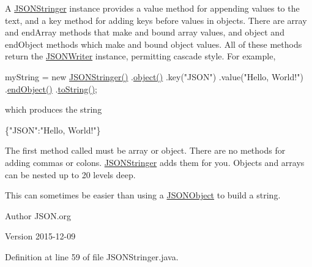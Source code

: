 A \hyperlink{classorg_1_1json_1_1JSONStringer}{J\-S\-O\-N\-Stringer} instance provides a {\ttfamily value} method for appending values to the text, and a {\ttfamily key} method for adding keys before values in objects. There are {\ttfamily array} and {\ttfamily end\-Array} methods that make and bound array values, and {\ttfamily object} and {\ttfamily end\-Object} methods which make and bound object values. All of these methods return the \hyperlink{classorg_1_1json_1_1JSONWriter}{J\-S\-O\-N\-Writer} instance, permitting cascade style. For example, 
\begin{DoxyPre}
myString = new \hyperlink{classorg_1_1json_1_1JSONStringer_a36d3accdcf3f40434edd9c33b414d3f9}{JSONStringer()}
    .\hyperlink{classorg_1_1json_1_1JSONWriter_a50ed212b9c8c9f6a57c3ddfc6bf3126a}{object()}
        .key("JSON")
        .value("Hello, World!")
    .\hyperlink{classorg_1_1json_1_1JSONWriter_a25cc931ef86998c61f08b1d5eff22146}{endObject()}
    .\hyperlink{classorg_1_1json_1_1JSONStringer_a2e7f28e99eb46f767b5df8a669e774b4}{toString()};\end{DoxyPre}
 which produces the string 
\begin{DoxyPre}
\{"JSON":"Hello, World!"\}\end{DoxyPre}
 

The first method called must be {\ttfamily array} or {\ttfamily object}. There are no methods for adding commas or colons. \hyperlink{classorg_1_1json_1_1JSONStringer}{J\-S\-O\-N\-Stringer} adds them for you. Objects and arrays can be nested up to 20 levels deep. 

This can sometimes be easier than using a \hyperlink{classorg_1_1json_1_1JSONObject}{J\-S\-O\-N\-Object} to build a string. \begin{DoxyAuthor}{Author}
J\-S\-O\-N.\-org 
\end{DoxyAuthor}
\begin{DoxyVersion}{Version}
2015-\/12-\/09 
\end{DoxyVersion}


Definition at line 59 of file J\-S\-O\-N\-Stringer.\-java.



